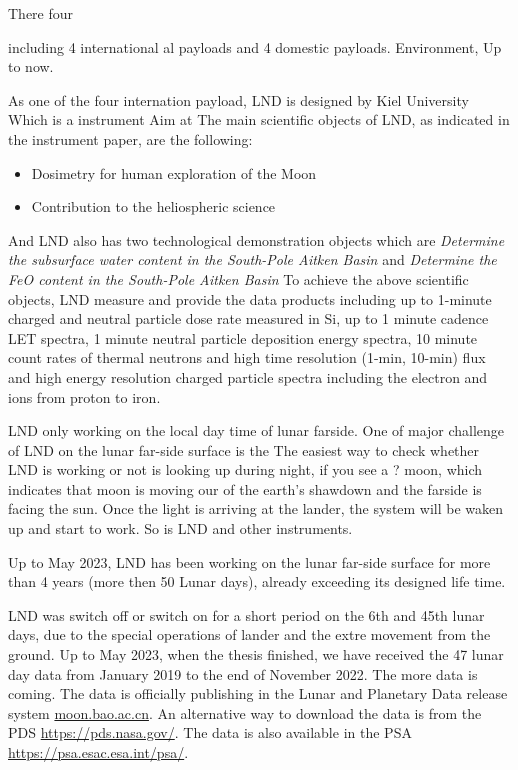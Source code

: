 There four 


including 4 international     al payloads and 4 domestic payloads.
Environment, 
Up to now.

As one of the four internation payload, LND is designed by  Kiel University
Which is a  instrument 
Aim at 
The main scientific objects of LND, as indicated in the instrument paper, are the following:
\begin{itemize}
    \item Dosimetry for human exploration of the Moon
    \item Contribution to the heliospheric science
\end{itemize}
And LND also has two technological demonstration objects which are \textit{Determine the subsurface water content in the South-Pole Aitken Basin} and \textit{Determine the FeO content in the South-Pole Aitken Basin} 
To achieve the above scientific objects, LND measure and provide the data products including up to 1-minute charged and neutral particle dose rate measured in Si, up to 1 minute cadence LET spectra, 1 minute neutral particle deposition energy spectra, 10 minute count rates of thermal neutrons and high time resolution (1-min, 10-min) flux and high energy resolution charged particle spectra including the electron and ions from proton to iron.


LND only working on the local day time of lunar farside. One of major challenge of LND on the lunar far-side surface is the 
The easiest way to check whether LND is working or not is looking up during night, if you see a ? moon, which indicates that moon is moving our of the earth's shawdown and the farside is facing the sun. Once the light is arriving at the lander, the system will be waken up and start to work. So is LND and other instruments.

Up to May 2023, LND has been working on the lunar far-side surface for more than 4 years (more then 50 Lunar days), already exceeding its designed life time. 

LND was switch off or switch on for a short period on the 6th and 45th lunar days, due to the special operations of lander and the extre movement from the ground. Up to May 2023, when the thesis finished, we have received the 47 lunar day data from January 2019 to the end of November 2022. The more data is coming. 
The data is officially publishing in the Lunar and Planetary Data release system \url{moon.bao.ac.cn}. An alternative way to download the data is from the PDS \url{https://pds.nasa.gov/}. The data is also available in the \ac{PSA} \url{https://psa.esac.esa.int/psa/}.

